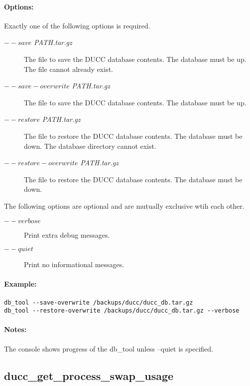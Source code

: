     \paragraph{Options:}
    Exactly one of the following options is required.
    \begin{description}
	        \item[$--save$ {\em PATH.tar.gz}] 
	          The file to save the DUCC database contents.  The database must be up.  The file cannot already exist.
       		\item[$--save-overwrite$ {\em PATH.tar.gz}] 
	          The file to save the DUCC database contents.  The database must be up.
	        \item[$--restore$ {\em PATH.tar.gz}] 
	          The file to restore the DUCC database contents.  The database must be down.  The database directory cannot exist.
	        \item[$--restore-overwrite$ {\em PATH.tar.gz}] 
	          The file to restore the DUCC database contents.  The database must be down.
     \end{description}
	 The following options are optional and are mutually exclusive wtih each other.
	 \begin{description}
	        \item[$--verbose$] 
	          Print extra debug messages.
       		\item[$--quiet$] 
	          Print no informational messages.
     \end{description}
	 
    \paragraph{Example:}
\begin{verbatim}
db_tool --save-overwrite /backups/ducc/ducc_db.tar.gz
db_tool --restore-overwrite /backups/ducc/ducc_db.tar.gz --verbose
\end{verbatim}

    \paragraph{Notes:}
    The console shows progress of the db\_tool unless --quiet is specified.   


\subsection{ducc\_get\_process\_swap\_usage}
\label{subsec:admin.ducc-get-process-swap-usage}
